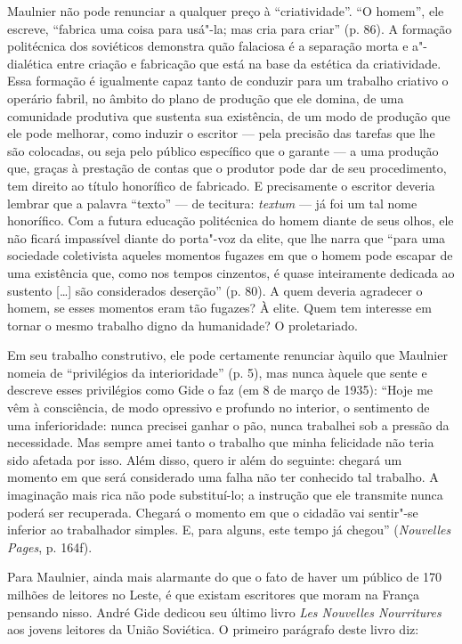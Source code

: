Maulnier não pode renunciar a qualquer preço à ``criatividade''. ``O
homem'', ele escreve, ``fabrica uma coisa para usá"-la; mas cria para
criar'' (p. 86). A formação politécnica dos soviéticos demonstra quão falaciosa é a separação morta e a"-dialética entre
criação e fabricação que está na base da estética da criatividade.
Essa formação é
igualmente capaz tanto de conduzir para um trabalho criativo o operário
fabril, no âmbito do plano de produção que ele domina, de uma comunidade
produtiva que sustenta sua existência, de um modo de produção que ele
pode melhorar, como induzir o escritor --- pela precisão das tarefas que
lhe são colocadas, ou seja pelo público específico que o garante --- a
uma produção que, graças à prestação de contas que o produtor pode dar
de seu procedimento, tem direito ao título honorífico de fabricado. E
precisamente o escritor deveria lembrar que a palavra ``texto'' --- de
tecitura: \emph{textum} --- já foi um tal nome honorífico. Com a futura
educação politécnica do homem diante de seus olhos, ele não ficará
impassível diante do porta"-voz da elite, que lhe narra que ``para uma
sociedade coletivista aqueles momentos fugazes em que o homem pode
escapar de uma existência que, como nos tempos cinzentos, é quase
inteiramente dedicada ao sustento {[}\ldots{}{]} são considerados deserção''
(p. 80). A quem deveria agradecer o homem, se esses momentos eram tão
fugazes? À elite. Quem tem interesse em tornar o mesmo trabalho digno da
humanidade? O proletariado.

Em seu trabalho construtivo, ele pode certamente renunciar àquilo que
Maulnier nomeia de ``privilégios da interioridade'' (p. 5), mas nunca
àquele que sente e descreve esses privilégios como Gide o faz (em 8 de
março de 1935): ``Hoje me vêm à consciência, de modo opressivo e
profundo no interior, o sentimento de uma inferioridade: nunca precisei
ganhar o pão, nunca trabalhei sob a pressão da necessidade. Mas sempre
amei tanto o trabalho que minha felicidade não teria sido afetada por
isso. Além disso, quero ir além do seguinte: chegará um momento em que
será considerado uma falha não ter conhecido tal trabalho. A imaginação
mais rica não pode substituí-lo; a instrução que ele transmite nunca
poderá ser recuperada. Chegará o momento em que o cidadão vai sentir"-se
inferior ao trabalhador simples. E, para alguns, este tempo já chegou''
(\emph{Nouvelles Pages}, p. 164f).

Para Maulnier, ainda mais alarmante do que o fato de haver um público de
170 milhões de leitores no Leste, é que existam escritores que moram na
França pensando nisso. André Gide dedicou seu último livro \emph{Les
Nouvelles Nourritures} aos jovens leitores da União Soviética. O
primeiro parágrafo deste livro diz:

